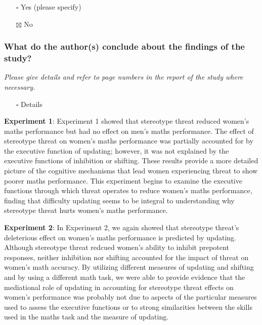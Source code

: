 \documentclass[
  doc, a4paper]{apa7}
\providecommand{\tightlist}{%
  \setlength{\itemsep}{0pt}\setlength{\parskip}{0pt}}
\begin{document}
\begin{itemize}
\tightlist
\item[$\square$]
  Yes (please specify)
\item[$\boxtimes$]
  No
\end{itemize}

\subsubsection{What do the author(s) conclude about the findings of the study?}\label{what-do-the-authors-conclude-about-the-findings-of-the-study}

\emph{Please give details and refer to page numbers in the report of the study where necessary.}

\begin{itemize}
\tightlist
\item[$\square$]
  Details
\end{itemize}

\textbf{Experiment 1}: Experiment 1 showed that stereotype threat reduced women's maths performance but had no effect on men's maths performance. The effect of stereotype threat on women's maths performance was partially accounted for by the executive function of updating; however, it was not explained by the executive functions of inhibition or shifting. These results provide a more detailed picture of the cognitive mechanisms that lead women experiencing threat to show poorer maths performance. This experiment begins to examine the executive functions through which threat operates to reduce women's maths performance, finding that difficulty updating seems to be integral to understanding why stereotype threat hurts women's maths performance.

\textbf{Experiment 2}:
In Experiment 2, we again showed that stereotype threat's deleterious effect on women's maths performance is predicted by updating. Although stereotype threat redcued women's ability to inhibit prepotent responses, neither inhibition nor shifting accounted for the impact of threat on women's math accuracy. By utilizing different measures of updating and shifting and by using a different math task, we were able to provide evidence that the mediational role of updating in accounting for stereotype threat effects on women's performance was probably not due to aspects of the particular measures used to assess the executive functions or to strong similarities between the skills used in the maths task and the measure of updating.
\end{document}
